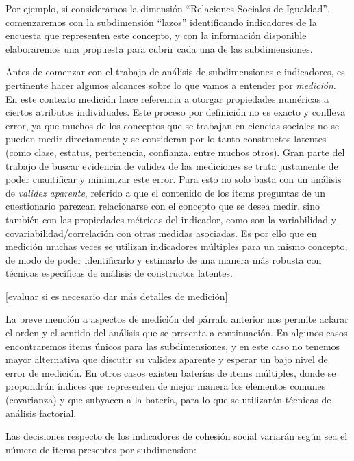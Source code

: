 \documentclass[
  12pt,
]{book}
\begin{document}
Por ejemplo, si consideramos la dimensión ``Relaciones Sociales de Igualdad'', comenzaremos con la subdimensión ``lazos'' identificando indicadores de la encuesta que representen este concepto, y con la información disponible elaboraremos una propuesta para cubrir cada una de las subdimensiones.

Antes de comenzar con el trabajo de análisis de subdimensiones e indicadores, es pertinente hacer algunos alcances sobre lo que vamos a entender por \emph{medición}. En este contexto medición hace referencia a otorgar propiedades numéricas a ciertos atributos individuales. Este proceso por definición no es exacto y conlleva error, ya que muchos de los conceptos que se trabajan en ciencias sociales no se pueden medir directamente y se consideran por lo tanto constructos latentes (como clase, estatus, pertenencia, confianza, entre muchos otros). Gran parte del trabajo de buscar evidencia de validez de las mediciones se trata justamente de poder cuantificar y minimizar este error. Para esto no solo basta con un análisis de \emph{validez aparente}, referido a que el contenido de los items preguntas de un cuestionario parezcan relacionarse con el concepto que se desea medir, sino también con las propiedades métricas del indicador, como son la variabilidad y covariabilidad/correlación con otras medidas asociadas. Es por ello que en medición muchas veces se utilizan indicadores múltiples para un mismo concepto, de modo de poder identificarlo y estimarlo de una manera más robusta con técnicas específicas de análisis de constructos latentes.

{[}evaluar si es necesario dar más detalles de medición{]}

La breve mención a aspectos de medición del párrafo anterior nos permite aclarar el orden y el sentido del análisis que se presenta a continuación. En algunos casos encontraremos items únicos para las subdimensiones, y en este caso no tenemos mayor alternativa que discutir su validez aparente y esperar un bajo nivel de error de medición. En otros casos existen baterías de items múltiples, donde se propondrán índices que representen de mejor manera los elementos comunes (covarianza) y que subyacen a la batería, para lo que se utilizarán técnicas de análisis factorial.

Las decisiones respecto de los indicadores de cohesión social variarán según sea el número de items presentes por subdimension:
\end{document}
